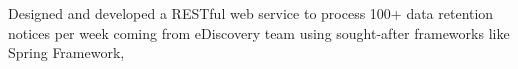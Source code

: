 \documentclass[letterpaper]{deedy-resume} %
\begin{document}
\begin{minipage}[t]{0.66\textwidth}
\sectionspace %


\begin{tightitemize}
\item Designed and developed a RESTful web service to process 100+ data retention notices per week coming from eDiscovery team using sought-after frameworks like Spring Framework,


\end{tightitemize}

\sectionspace %



\sectionspace %


\sectionspace %



\sectionspace %


\end{minipage} %








\end{document}

